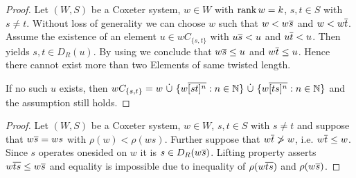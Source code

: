 \begin{lemm}
\begin{proof}
Let $(W,S)$ be a Coxeter system, $w \in W$ with $\operatorname{rank} w = k$, $s, t \in S$ with
$s \neq t$. Without loss of generality we can choose $w$ such that $w < w \overline{s}$
and $w < w \overline{t}$. Assume the existence of an element $u \in wC_{\{s,t\}}$ with
$u \overline{s} < u$ and $u \overline{t} < u$. Then \cite[Lemma
3.8]{hultman:comb-twisted-invo} yields $s,t \in D_R(u)$. By using \cite[Lemma
3.9]{hultman:comb-twisted-invo} we conclude that $w \overline{s} \leq u$ and $w \overline{t}
\leq u$. Hence there cannot exist more than two Elements of same twisted
length.

If no such $u$ exists, then $wC_{\{s,t\}} = w \ \dot \cup \ \{ w \ul{[st]^n} : n
\in \nn \} \ \dot \cup \ \{ w \ul{[ts]^n} : n \in \nn \}$ and the assumption
still holds.
\end{proof}
\end{lemm}

\begin{lemm}
\begin{proof}
Let $(W,S)$ be a Coxeter system, $w \in W$, $s, t \in S$ with $s \neq t$ and
suppose that $w \overline{s} = ws$ with $\rho(w) < \rho(ws)$. Further suppose that $w
\overline{t} \not > w$, i.e.
$w \overline{t} \leq w$. Since $s$ operates onesided on $w$ it is $s \in D_R(w \overline{s})$.
Lifting property \cite[Proposition 3.10]{hultman:comb-twisted-invo} asserts $w
\overline{ts} \leq w \overline{s}$ and equality is impossible due to inequality of $\rho(w
\overline{ts})$ and $\rho(w \overline{s})$.
\end{proof}
\end{lemm}